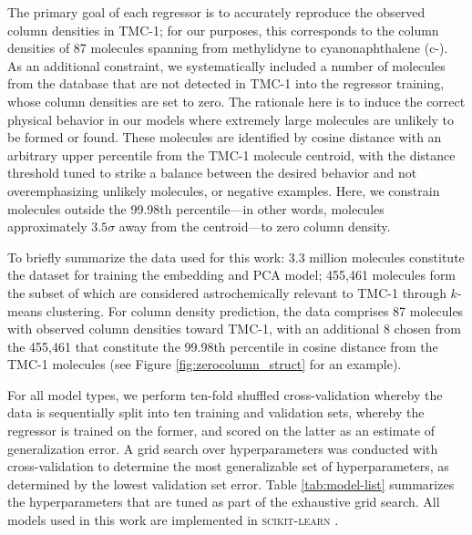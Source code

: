 \documentclass[twocolumn]{aastex63}
\begin{document}
The primary goal of each regressor is to accurately reproduce the observed column densities in TMC-1; for our purposes, this corresponds to the column densities of 87 molecules spanning from methylidyne  to cyanonaphthalene (c-). As an additional constraint, we systematically included a number of molecules from the database that are not detected in TMC-1 into the regressor training, whose column densities are set to zero. The rationale here is to induce the correct physical behavior in our models where extremely large molecules are unlikely to be formed or found. These molecules are identified by cosine distance with an arbitrary upper percentile from the TMC-1 molecule centroid, with the distance threshold tuned to strike a balance between the desired behavior and not overemphasizing unlikely molecules, or negative examples. Here, we constrain molecules outside the 99.98th percentile---in other words, molecules approximately $3.5\sigma$ away from the centroid---to zero column density.

To briefly summarize the data used for this work: 3.3 million molecules constitute the dataset for training the embedding and PCA model; 455,461 molecules form the subset of which are considered astrochemically relevant to TMC-1 through $k$-means clustering. For column density prediction, the data comprises 87 molecules with observed column densities toward TMC-1, with an additional 8 chosen from the 455,461 that constitute the 99.98th percentile in cosine distance from the TMC-1 molecules (see Figure \ref{fig:zerocolumn_struct} for an example).

For all model types, we perform ten-fold shuffled cross-validation whereby the data is sequentially split into ten training and validation sets, whereby the regressor is trained on the former, and scored on the latter as an estimate of generalization error. A grid search over hyperparameters was conducted with cross-validation to determine the most generalizable set of hyperparameters, as determined by the lowest validation set error. Table \ref{tab:model-list} summarizes the hyperparameters that are tuned as part of the exhaustive grid search. All models used in this work are implemented in \textsc{scikit-learn} \citep{pedregosa_scikit-learn:_2011}.
\end{document}
